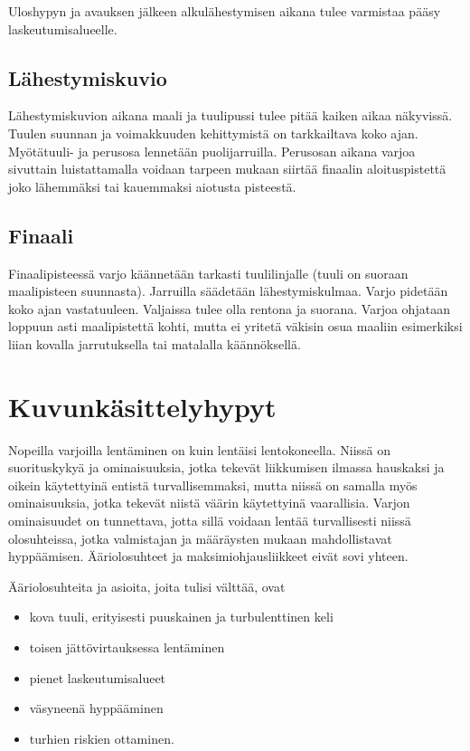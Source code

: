 Uloshypyn ja avauksen jälkeen alkulähestymisen aikana tulee varmistaa pääsy laskeutumisalueelle. 

\subsection{ Lähestymiskuvio }
\label{kuvunkasittely-oppilaana-lahestymiskuvio}


Lähestymiskuvion aikana maali ja tuulipussi tulee pitää kaiken aikaa näkyvissä. Tuulen suunnan ja voimakkuuden kehittymistä on tarkkailtava koko ajan. Myötätuuli- ja perusosa lennetään puolijarruilla. Perusosan aikana varjoa sivuttain luistattamalla voidaan tarpeen mukaan siirtää finaalin aloituspistettä joko lähemmäksi tai kauemmaksi aiotusta pisteestä. 

\subsection{ Finaali }
\label{kuvunkasittely-oppilaana-finaali}


Finaalipisteessä varjo käännetään tarkasti tuulilinjalle (tuuli on suoraan maalipisteen suunnasta). Jarruilla säädetään lähestymiskulmaa. Varjo pidetään koko ajan vastatuuleen. Valjaissa tulee olla rentona ja suorana. Varjoa ohjataan loppuun asti maalipistettä kohti, mutta ei yritetä väkisin osua maaliin esimerkiksi liian kovalla jarrutuksella tai matalalla käännöksellä. 

\section{ Kuvunkäsittelyhypyt }
\label{kuvunkasittely-oppilaana-kuvunkasittelyhypyt}


Nopeilla varjoilla lentäminen on kuin lentäisi lentokoneella. Niissä on suorituskykyä ja ominaisuuksia, jotka tekevät liikkumisen ilmassa hauskaksi ja oikein käytettyinä entistä turvallisemmaksi, mutta niissä on samalla myös ominaisuuksia, jotka tekevät niistä väärin käytettyinä vaarallisia. Varjon ominaisuudet on tunnettava, jotta sillä voidaan lentää turvallisesti niissä olosuhteissa, jotka valmistajan ja määräysten mukaan mahdollistavat hyppäämisen. Ääriolosuhteet ja maksimiohjausliikkeet eivät sovi yhteen. 


Ääriolosuhteita ja asioita, joita tulisi välttää, ovat 

\begin{itemize}
\item  kova tuuli, erityisesti puuskainen ja turbulenttinen keli 
\item  toisen jättövirtauksessa lentäminen 
\item  pienet laskeutumisalueet 
\item  väsyneenä hyppääminen 
\item  turhien riskien ottaminen. 
\end{itemize}
